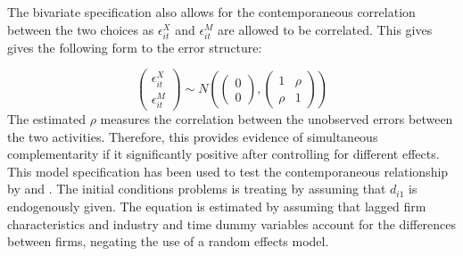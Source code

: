 \documentclass[11pt]{article}
\begin{document}
The bivariate specification also allows for the
contemporaneous correlation between the two choices as
$\epsilon_{it}^{X}$ and $\epsilon_{it}^{M}$ are allowed to be
correlated. This gives gives the following form to the error
structure: 


\[\begin{pmatrix}
\epsilon_{it}^{X} \\
\epsilon_{it}^{M}
\end{pmatrix}\sim N\left(\begin{pmatrix}
0 \\
0
\end{pmatrix},\begin{pmatrix}
1 & \rho \\
\rho & 1
\end{pmatrix}\right)
\]
The estimated $\rho$ measures the correlation between the unobserved
errors between the two activities. Therefore, this provides evidence
of simultaneous complementarity if it significantly positive after
controlling for different effects. 
This model specification has been used to test the contemporaneous relationship
by \cite{aristei2013firms} and \cite{aw2011}. 
The initial conditions problems is treating by assuming that $d_{i1}$ is 
endogenously given. The  equation is estimated by assuming that lagged
firm characteristics and industry and time  dummy variables account
for the differences between firms, negating the use of a random
effects model. 
\end{document}
